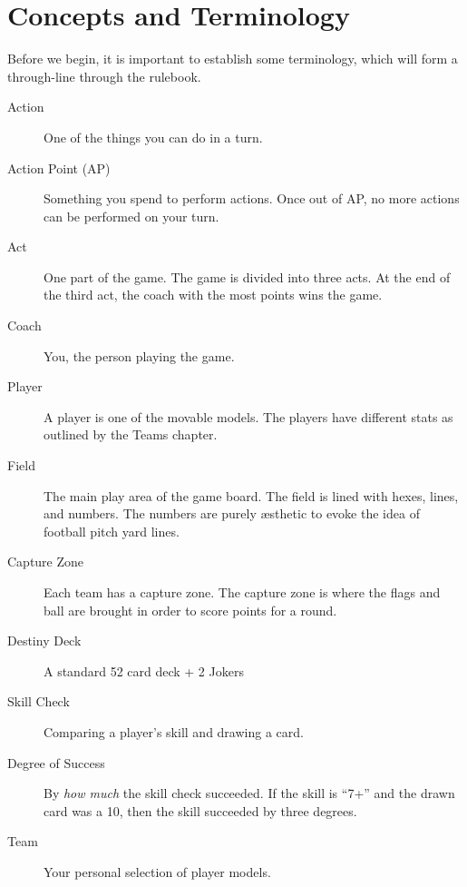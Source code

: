 \chapter{Concepts and Terminology}
Before we begin, it is important to establish some terminology, which will form a through-line through the rulebook.

\begin{description}
\item[Action] One of the things you can do in a turn.
\item[Action Point (AP)] Something you spend to perform actions. Once out of AP, no more actions can be performed on your turn.
\item[Act] One part of the game. The game is divided into three acts. At the end of the third act, the coach with the most points wins the game.
\item[Coach] You, the person playing the game.
\item[Player] A player is one of the movable models.
The players have different stats as outlined by the Teams chapter.
\item[Field] The main play area of the game board. The field is lined with hexes, lines, and numbers. The numbers are purely æsthetic to evoke the idea of football pitch yard lines.
\item[Capture Zone] Each team has a capture zone.
The capture zone is where the flags and ball are brought in order to score points for a round.
\item[Destiny Deck] A standard 52 card deck + 2 Jokers
\item[Skill Check] Comparing a player's skill and drawing a \destiny{} card.
\item[Degree of Success] By \textit{how much} the skill check succeeded. If the skill is ``7+'' and the drawn card was a 10, then the skill succeeded by three degrees. 
\item[Team] Your personal selection of player models.
\end{description}